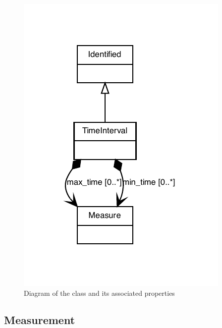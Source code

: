 \begin{figure}[ht]
\begin{center}
\includegraphics[scale=0.6]{figures/TimeInterval}
\caption[]{Diagram of the  class and its associated properties}
\label{uml:TimeInterval}
\end{center}
\end{figure}


\subsection{Measurement}
\label{sec:Measurement}

